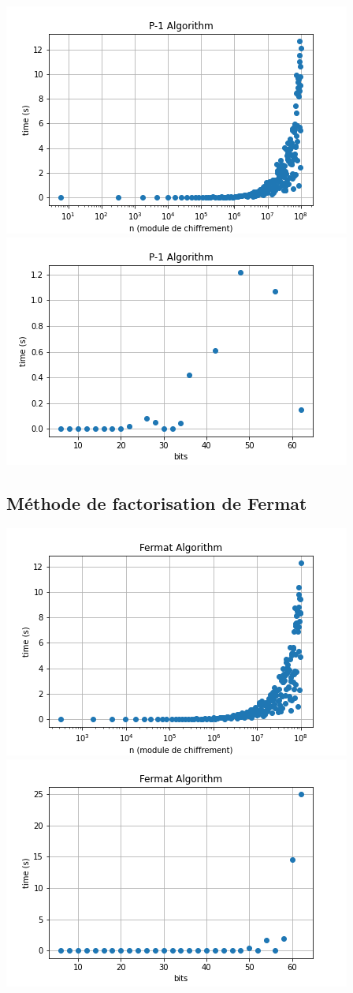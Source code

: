 \documentclass[a4paper, 12pt]{article}
\begin{document}
\begin{center}
    \includegraphics[width=0.7\linewidth]{images/p_one_big.png}
    \includegraphics[width=0.7\linewidth]{images/p_one_small.png}
\end{center}

\subsection{Méthode de factorisation de Fermat}

\begin{center}
    \includegraphics[width=0.7\linewidth]{images/fermat_big.png}
    \includegraphics[width=0.7\linewidth]{images/fermat_small.png}
\end{center}
\end{document}
